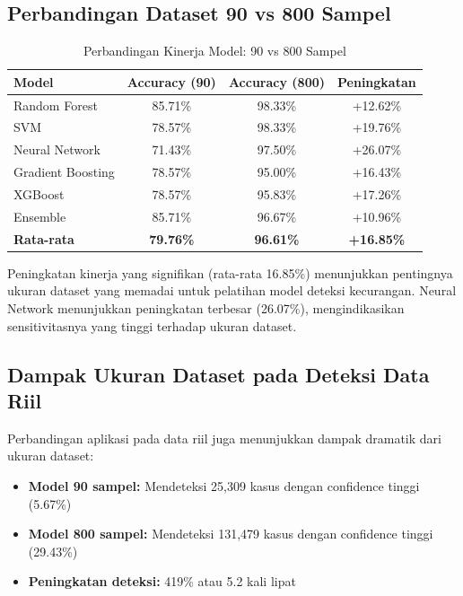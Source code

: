 \subsection{Perbandingan Dataset 90 vs 800 Sampel}
\label{subsec:perbandingan90vs800}

\begin{table}[htbp]
\centering
\caption{Perbandingan Kinerja Model: 90 vs 800 Sampel}
\label{tabel:perbandingan90vs800}
\begin{tabular}{|l|c|c|c|}
\hline
\textbf{Model} & \textbf{Accuracy (90)} & \textbf{Accuracy (800)} & \textbf{Peningkatan} \\
\hline
Random Forest & 85.71\% & 98.33\% & +12.62\% \\
\hline
SVM & 78.57\% & 98.33\% & +19.76\% \\
\hline
Neural Network & 71.43\% & 97.50\% & +26.07\% \\
\hline
Gradient Boosting & 78.57\% & 95.00\% & +16.43\% \\
\hline
XGBoost & 78.57\% & 95.83\% & +17.26\% \\
\hline
Ensemble & 85.71\% & 96.67\% & +10.96\% \\
\hline
\textbf{Rata-rata} & \textbf{79.76\%} & \textbf{96.61\%} & \textbf{+16.85\%} \\
\hline
\end{tabular}
\end{table}

Peningkatan kinerja yang signifikan (rata-rata 16.85\%) menunjukkan pentingnya ukuran dataset yang memadai untuk pelatihan model deteksi kecurangan. Neural Network menunjukkan peningkatan terbesar (26.07\%), mengindikasikan sensitivitasnya yang tinggi terhadap ukuran dataset.

\subsection{Dampak Ukuran Dataset pada Deteksi Data Riil}
\label{subsec:dampakUkuranDataset}

Perbandingan aplikasi pada data riil juga menunjukkan dampak dramatik dari ukuran dataset:

\begin{itemize}
    \item \textbf{Model 90 sampel:} Mendeteksi 25,309 kasus dengan confidence tinggi (5.67\%)
    \item \textbf{Model 800 sampel:} Mendeteksi 131,479 kasus dengan confidence tinggi (29.43\%)
    \item \textbf{Peningkatan deteksi:} 419\% atau 5.2 kali lipat
\end{itemize}


